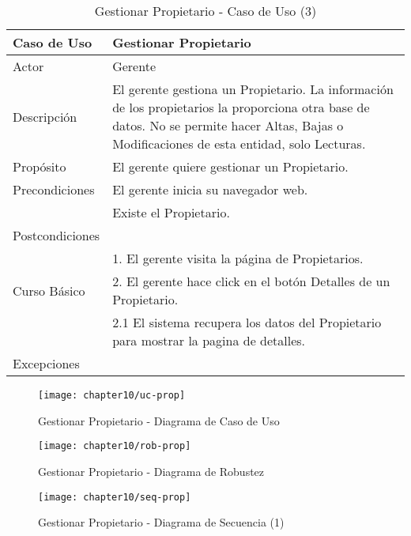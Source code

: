 \begin{table}[H]
    \begin{tabular}{@{} p{3cm} p{10cm} @{}} \toprule
    \textbf{Caso de Uso}    & Gestionar Propietario \\ \midrule
    Actor                   & Gerente \\ \cmidrule{1-2}
    Descripción             & El gerente gestiona un Propietario. La información de los propietarios la proporciona otra base de datos. No se permite hacer Altas, Bajas o Modificaciones de esta entidad, solo Lecturas. \\ \cmidrule{1-2}
    Propósito               & El gerente quiere gestionar un Propietario. \\ \cmidrule{1-2}
    Precondiciones          & El gerente inicia su navegador web. \\ 
                            & Existe el Propietario. \\ \cmidrule{1-2} 
    Postcondiciones         & \\ \cmidrule{1-2} 
                            & 1. El gerente visita la página de Propietarios. \\ 
    Curso Básico            & 2. El gerente hace click en el botón Detalles de un Propietario. \\
                            & 2.1 El sistema recupera los datos del Propietario para mostrar la pagina de detalles. \\ \cmidrule{1-2}
    Excepciones             & \\ \bottomrule
   \end{tabular}
        \caption{Gestionar Propietario - Caso de Uso (3)}
        \label{tab:tabcu-prop}
\end{table}

    \begin{figure}[H]
        \centering
        \texttt{[image: chapter10/uc-prop]}
        \caption{Gestionar Propietario - Diagrama de Caso de Uso}
        \label{fig:uc-prop}
    \end{figure}
    
    
    \begin{figure}[H]
        \centering
        \texttt{[image: chapter10/rob-prop]}
        \caption{Gestionar Propietario - Diagrama de Robustez}
        \label{fig:rob-prop}
    \end{figure}
    \begin{landscape}
        
    \begin{figure}[H]
        \centering
        \texttt{[image: chapter10/seq-prop]}
        \caption{Gestionar Propietario - Diagrama de Secuencia (1) }
        \label{fig:seq-prop}
    \end{figure}
    \end{landscape}
    

